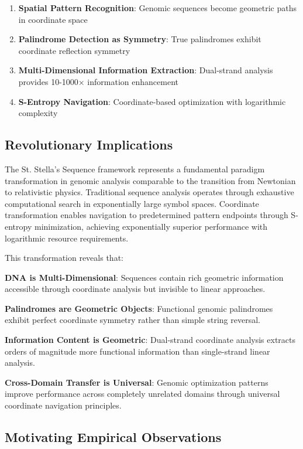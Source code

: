\documentclass[12pt,a4paper]{article}
\begin{document}
\begin{enumerate}
\item \textbf{Spatial Pattern Recognition}: Genomic sequences become geometric paths in coordinate space
\item \textbf{Palindrome Detection as Symmetry}: True palindromes exhibit coordinate reflection symmetry
\item \textbf{Multi-Dimensional Information Extraction}: Dual-strand analysis provides 10-1000× information enhancement
\item \textbf{S-Entropy Navigation}: Coordinate-based optimization with logarithmic complexity
\end{enumerate}

\subsection{Revolutionary Implications}

The St. Stella's Sequence framework represents a fundamental paradigm transformation in genomic analysis comparable to the transition from Newtonian to relativistic physics. Traditional sequence analysis operates through exhaustive computational search in exponentially large symbol spaces. Coordinate transformation enables navigation to predetermined pattern endpoints through S-entropy minimization, achieving exponentially superior performance with logarithmic resource requirements.

This transformation reveals that:

\textbf{DNA is Multi-Dimensional}: Sequences contain rich geometric information accessible through coordinate analysis but invisible to linear approaches.

\textbf{Palindromes are Geometric Objects}: Functional genomic palindromes exhibit perfect coordinate symmetry rather than simple string reversal.

\textbf{Information Content is Geometric}: Dual-strand coordinate analysis extracts orders of magnitude more functional information than single-strand linear analysis.

\textbf{Cross-Domain Transfer is Universal}: Genomic optimization patterns improve performance across completely unrelated domains through universal coordinate navigation principles.

\subsection{Motivating Empirical Observations}
\end{document}
